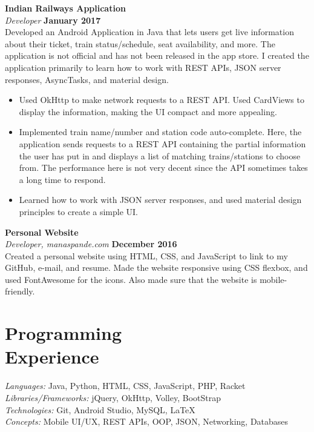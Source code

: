 \documentclass[margin,line]{resume}
\begin{document}
\begin{resume}
    \textbf{Indian Railways Application} \vspace{2mm}\\\vspace{1mm}%
    \textsl{Developer} \hfill \textbf{January 2017}\\
    Developed an Android Application in Java that lets users get live information about their ticket, train status/schedule, seat availability, and more. The application is not official and has not been released in the app store. I created the application primarily to learn how to work with REST APIs, JSON server responses, AsyncTasks, and material design.

    \begin{itemize}
    \item Used OkHttp to make network requests to a REST API. Used CardViews to display the information, making the UI compact and more appealing.
    \item Implemented train name/number and station code auto-complete. Here, the application sends requests to a REST API containing the partial information the user has put in and displays a list of matching trains/stations to choose from. The performance here is not very decent since the API sometimes takes a long time to respond.
    \item Learned how to work with JSON server responses, and used material design principles to create a simple UI.
    \end{itemize}

    \textbf{Personal Website}\vspace{2mm}\\\vspace{1mm}%
    \textsl{Developer, manaspande.com} \hfill \textbf{December 2016}\\
    Created a personal website using HTML, CSS, and JavaScript to link to my GitHub, e-mail, and resume. Made the website responsive using CSS flexbox, and used FontAwesome for the icons. Also made sure that the website is mobile-friendly.

    \section{\mysidestyle Programming\\Experience}

    \emph{Languages:} Java, Python, HTML, CSS, JavaScript, PHP, Racket \\
    \emph{Libraries/Frameworks:} jQuery, OkHttp, Volley, BootStrap
    \\
    \emph{Technologies:} Git, Android Studio, MySQL, \LaTeX
    \\
    \emph{Concepts:} Mobile UI/UX, REST APIs, OOP, JSON, Networking, Databases
\vspace{-2mm}

\end{resume}
\end{document}
